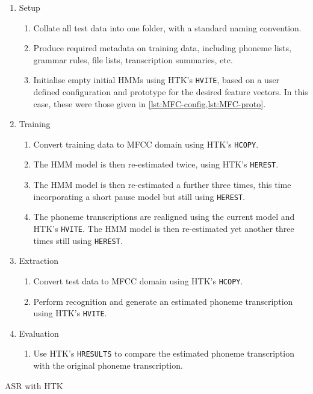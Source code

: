 \begin{algorithm}
\begin{enumerate}
\item Setup

\begin{enumerate}
\item Collate all test data into one folder, with a standard naming convention.
\item Produce required metadata on training data, including phoneme lists,
grammar rules, file lists, transcription summaries, etc.
\item Initialise empty initial \acp{HMM} using \ac{HTK}'s \lstinline[language=bash]!HVITE!,
based on a user defined configuration and prototype for the desired
feature vectors. In this case, these were those given in \cref{lst:MFC-config,lst:MFC-proto}.
\end{enumerate}
\item Training

\begin{enumerate}
\item Convert training data to \ac{MFCC} domain using \ac{HTK}'s \lstinline[language=bash]!HCOPY!.
\item The \ac{HMM} model is then re-estimated twice, using \ac{HTK}'s
\lstinline[language=bash]!HEREST!.
\item The \ac{HMM} model is then re-estimated a further three times, this
time incorporating a short pause model but still using \lstinline[language=bash]!HEREST!.
\item The phoneme transcriptions are realigned using the current model and
\ac{HTK}'s \lstinline[language=bash]!HVITE!. The \ac{HMM} model
is then re-estimated yet another three times still using \lstinline[language=bash]!HEREST!.
\end{enumerate}
\item Extraction

\begin{enumerate}
\item Convert test data to \ac{MFCC} domain using \ac{HTK}'s \lstinline[language=bash]!HCOPY!.
\item Perform recognition and generate an estimated phoneme transcription
using \ac{HTK}'s \lstinline[language=bash]!HVITE!.
\end{enumerate}
\item Evaluation

\begin{enumerate}
\item Use \ac{HTK}'s \lstinline[language=bash]!HRESULTS! to compare the
estimated phoneme transcription with the original phoneme transcription.
\end{enumerate}
\end{enumerate}
\protect\caption{\label{alg:ASR} \acs{ASR} with \acs{HTK}}
\end{algorithm}


